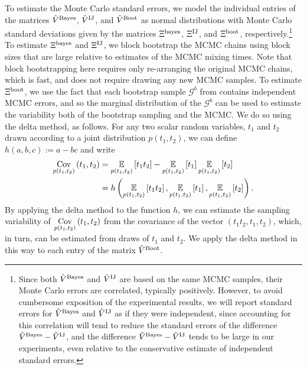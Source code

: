 To estimate the Monte Carlo standard errors, we model the individual entries of
the matrices $\hat{V}^{\mathrm{Bayes}}$, $\hat{V}^{\mathrm{IJ}}$, and $\hat{V}^{\mathrm{Boot}}$ as normal
distributions with Monte Carlo standard deviations given by the matrices
$\Xi^{\textrm{bayes}}$, $\Xi^{\textrm{IJ}}$, and $\Xi^{\textrm{boot}}$, respectively.\footnote{Since both
$\hat{V}^{\mathrm{Bayes}}$ and $\hat{V}^{\mathrm{IJ}}$ are based on the same MCMC samples, their Monte
Carlo errors are correlated, typically positively.  However, to avoid cumbersome
exposition of the experimental results, we will report standard errors for
$\hat{V}^{\mathrm{Bayes}}$ and $\hat{V}^{\mathrm{IJ}}$ as if they were independent, since accounting
for this correlation will tend to reduce the standard errors of the difference
$\hat{V}^{\mathrm{Bayes}} - \hat{V}^{\mathrm{IJ}}$, and the difference $\hat{V}^{\mathrm{Bayes}} - \hat{V}^{\mathrm{IJ}}$
tends to be large in our experiments, even relative to the conservative estimate
of independent standard errors.
}
%
To estimate $\Xi^{\textrm{bayes}}$ and $\Xi^{\textrm{IJ}}$, we block bootstrap the MCMC chains using
block sizes that are large relative to estimates of the MCMC mixing times.
Note that block bootstrapping here requires only re-arranging the original MCMC
chains, which is fast, and does not require drawing any new MCMC samples.  To
estimate $\Xi^{\textrm{boot}}$, we use the fact that each bootstrap sample $\mathscr{G}^b$
from  contains independent MCMC errors, and so the marginal
distribution of the $\mathscr{G}^b$ can be used to estimate the variability both
of the bootstrap sampling and the MCMC.  We do so using the delta method, as
follows.  For any two scalar random variables, $t_1$ and $t_2$ drawn according
to a joint distribution $p(t_1, t_2)$, we can define $h(a, b, c) :={} a - bc$
and write
%
\begin{align*}
%
\cov{p(t_1, t_2)}{t_1, t_2} &={}
    \expect{p(t_1, t_2)}{t_1 t_2} -
    \expect{p(t_1, t_2)}{t_1}\expect{p(t_1, t_2)}{t_2}\\
&={} h\left(\expect{p(t_1, t_2)}{t_1 t_2},
     \expect{p(t_1, t_2)}{t_1},
     \expect{p(t_1, t_2)}{t_2} \right).
%
\end{align*}
%
By applying the delta method to the function $h$, we can estimate the sampling
variability of $\underset{p(t_1, t_2)}{\mathrm{Cov}}\left(t_1, t_2\right)$ from the covariance of the vector
$(t_1 t_2, t_1, t_2)$, which, in turn, can be estimated from draws of $t_1$ and
$t_2$.  We apply the delta method in this way to each entry of the matrix
$\hat{V}^{\mathrm{Boot}}$.
